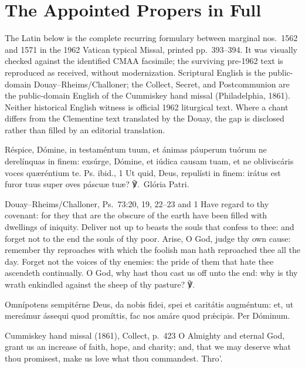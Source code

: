 \section*{The Appointed Propers in Full}

\noindent The Latin below is the complete recurring formulary between marginal
nos.~1562 and 1571 in the 1962 Vatican typical Missal, printed pp.~393--394.
It was visually checked against the identified CMAA facsimile; the surviving
pre-1962 text is reproduced as received, without modernization. Scriptural
English is the public-domain Douay--Rheims/Challoner; the Collect, Secret, and
Postcommunion are the public-domain English of the Cummiskey hand missal
(Philadelphia, 1861). Neither historical English witness is official 1962
liturgical text. Where a chant differs from the Clementine text translated by
the Douay, the gap is disclosed rather than filled by an editorial translation.

Réspice, Dómine, in testaméntum tuum, et ánimas páuperum tuórum ne
derelínquas in finem: exsúrge, Dómine, et iúdica causam tuam, et ne
obliviscáris voces quæréntium te. \textnormal{Ps. ibid., 1} Ut quid, Deus,
repulísti in finem: irátus est furor tuus super oves páscuæ tuæ?
℣.~Glória Patri.
\finishfulltextelement
\begin{fulltextenglish}{Douay--Rheims/Challoner, Ps.~73:20, 19, 22--23 and 1}
Have regard to thy covenant: for they that are the obscure of the earth have
been filled with dwellings of iniquity. Deliver not up to beasts the souls
that confess to thee: and forget not to the end the souls of thy poor. Arise,
O God, judge thy own cause: remember thy reproaches with which the foolish man
hath reproached thee all the day. Forget not the voices of thy enemies: the
pride of them that hate thee ascendeth continually. O God, why hast thou cast
us off unto the end: why is thy wrath enkindled against the sheep of thy
pasture? ℣.~
\end{fulltextenglish}

Omnípotens sempitérne Deus, da nobis fidei, spei et caritátis augméntum: et,
ut mereámur ássequi quod promíttis, fac nos amáre quod prǽcipis. Per Dóminum.
\finishfulltextelement
\begin{fulltextenglish}{Cummiskey hand missal (1861), Collect, p.~423}
O Almighty and eternal God, grant us an increase of faith, hope, and charity;
and, that we may deserve what thou promisest, make us love what thou
commandest. Thro'.
\end{fulltextenglish}

